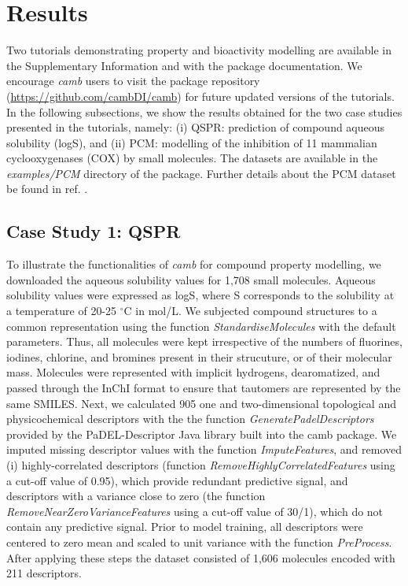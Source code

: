 \documentclass[twoside,a4wide,10pt]{article}
\begin{document}
\section*{Results}
Two tutorials demonstrating property and bioactivity modelling are available in the Supplementary Information
and with the package documentation.
We encourage {\it camb} users to visit the package repository (\url{https://github.com/cambDI/camb})
for future updated versions of the tutorials.
In the following subsections, we show the results obtained for the two case studies 
presented in the tutorials, namely:
(i) QSPR: prediction of compound aqueous solubility (logS),
and (ii) PCM:
modelling of the inhibition of 11 mammalian cyclooxygenases (COX) by small molecules.
The datasets are available in the {\it examples/PCM} directory of the package.
Further details about the PCM dataset be found in ref. \citep{cortesCOX}.

\subsection{Case Study 1: QSPR}

To illustrate the functionalities of {\it camb} for compound property modelling,
we downloaded the aqueous solubility values for 1,708 small molecules.
Aqueous solubility values were expressed as logS, where S corresponds to the solubility at a temperature of 20-25 $^{\circ}$C in mol/L.
We subjected compound structures to a common representation using the function 
{\it StandardiseMolecules} with the default parameters.
Thus, all molecules were kept irrespective of the numbers of fluorines, iodines, chlorine, and bromines
present in their strucuture, or of their molecular mass.
Molecules were represented with implicit hydrogens, dearomatized, 
and passed through the InChI format to ensure that tautomers are represented by the same SMILES. %
Next, we calculated 905 one and two-dimensional topological and
physicochemical descriptors with the the function {\it GeneratePadelDescriptors}
provided by the PaDEL-Descriptor \citep{padel} Java library built into the camb package.
We imputed missing descriptor values with the function {\it ImputeFeatures},
and removed (i) highly-correlated descriptors (function {\it RemoveHighlyCorrelatedFeatures} using a cut-off value of 0.95), 
which provide redundant predictive signal, 
and descriptors with a variance close to zero (the function {\it RemoveNearZeroVarianceFeatures} using a cut-off value of 30/1),
which do not contain any predictive signal.
Prior to model training, all descriptors were centered to zero mean and scaled to unit variance
with the function {\it PreProcess}.
After applying these steps the dataset consisted of 1,606 molecules
encoded with 211 descriptors.\\
\end{document}
